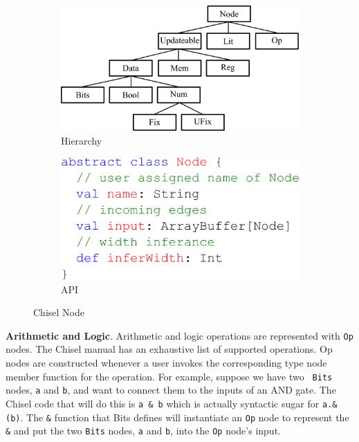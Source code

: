 \begin{figure}[hb]
\centering
  \begin{subfigure}[t]{0.48\textwidth}
  \includegraphics[width=\textwidth]{figures/hierarchy.pdf}
  \caption{Hierarchy}
  \label{fig:hier}
  \end{subfigure}
  \hfill
  \begin{subfigure}[t]{0.48\textwidth}
  \includegraphics[width=\textwidth]{figures/node.pdf}
  \caption{API}
  \label{fig:nodeapi}
  \end{subfigure}
  \hfill
  \caption{Chisel Node}
  \label{fig:node}
\end{figure}

{\bf Arithmetic and Logic}. Arithmetic and logic operations
are represented with {\tt Op} nodes. The Chisel manual has an
exhaustive list of supported operations. Op nodes are constructed
whenever a user invokes the corresponding type node member
function for the operation. For example, suppose we have two {\tt
Bits} nodes, {\tt a} and {\tt b}, and want to connect them to the
inputs of an AND gate. The Chisel code that will do this is {\tt a \&
b} which is actually syntactic sugar for {\tt a.\&(b)}. The {\tt \&}
function that Bits defines will instantiate an {\tt Op} node to
represent the {\tt \&} and put the two {\tt Bits} nodes, {\tt a} and
{\tt b}, into the {\tt Op} node's input.

